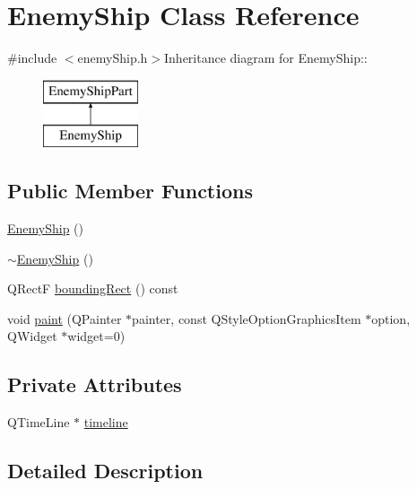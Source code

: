 \hypertarget{class_enemy_ship}{
\section{EnemyShip Class Reference}
\label{class_enemy_ship}
}


{\ttfamily \#include $<$enemyShip.h$>$}Inheritance diagram for EnemyShip::\begin{figure}[H]
\begin{center}
\leavevmode
\includegraphics[height=2cm]{class_enemy_ship}
\end{center}
\end{figure}
\subsection*{Public Member Functions}
\begin{DoxyCompactItemize}
\item 
\hyperlink{class_enemy_ship_a786aafea29d674b7b3453a2a24f1d11c}{EnemyShip} ()
\item 
\hyperlink{class_enemy_ship_a1ac35529a92de9465e7d0a65c7060220}{$\sim$EnemyShip} ()
\item 
QRectF \hyperlink{class_enemy_ship_a686ecac9600cf96356853ecda872ded0}{boundingRect} () const 
\item 
void \hyperlink{class_enemy_ship_acdd59ef427b1f6919dc6bb32ff45bdc6}{paint} (QPainter $\ast$painter, const QStyleOptionGraphicsItem $\ast$option, QWidget $\ast$widget=0)
\end{DoxyCompactItemize}
\subsection*{Private Attributes}
\begin{DoxyCompactItemize}
\item 
QTimeLine $\ast$ \hyperlink{class_enemy_ship_aef8e031f014691c7c6cc66864d505f45}{timeline}
\end{DoxyCompactItemize}


\subsection{Detailed Description}


